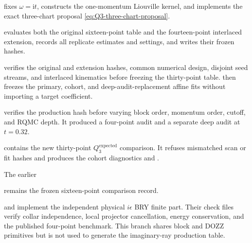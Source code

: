 \documentclass[11pt]{article}
\newcommand{\ii}{\mathrm{i}}
\begin{document}
\begin{description}[style=nextline,leftmargin=3.8cm]
  \item[Convergent kernel]
   fixes $\omega=\ii t$,
  constructs the one-momentum Liouville kernel, and implements the exact
  three-chart proposal \eqref{eq:Q3-three-chart-proposal}.

  \item[Blind production]
  \par
  evaluates both the original
  sixteen-point table and the fourteen-point interlaced extension, records
  all replicate estimates and settings, and writes their frozen hashes.

  \item[Blind merge and fit]
   verifies the original
  and extension hashes, common numerical design, disjoint seed streams, and
  interlaced kinematics before freezing the thirty-point table.
   then freezes the primary,
  cohort, and deep-audit-replacement affine fits without importing a target
  coefficient.

  \item[Blind convergence]
   verifies the production hash
  before varying block order, momentum order, cutoff, and RQMC depth.  It
  produced a four-point audit and a separate deep audit at $t=0.32$.

  \item[Later comparison]
  \par
  contains the new
  thirty-point $Q_3^{\mathrm{expected}}$ comparison.  It refuses mismatched
  scan or fit hashes and produces the cohort diagnostics and
  .\par
  The earlier \par
  remains the frozen
  sixteen-point comparison record.

  \item[Physical control branch]
   and
   implement the independent physical
  $i\epsilon$ BRY finite part.  Their check files verify collar independence,
  local projector cancellation, energy conservation, and the published
  four-point benchmark.  This branch shares block and DOZZ primitives but is
  not used to generate the imaginary-ray production table.
\end{description}
\end{document}
